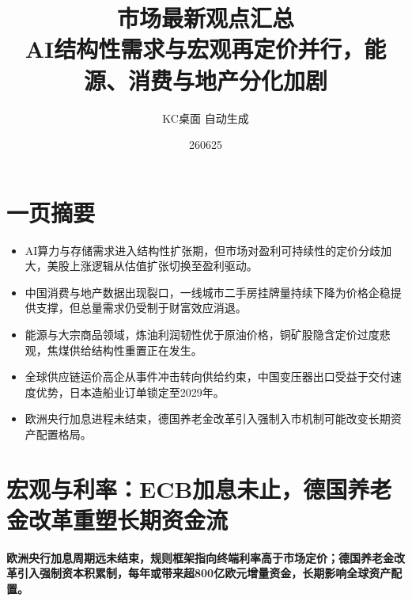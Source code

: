 \documentclass[11pt]{ctexart}
\title{\textbf{市场最新观点汇总}\\[0.4em]{\large AI结构性需求与宏观再定价并行，能源、消费与地产分化加剧}}
\author{KC桌面 自动生成}
\date{260625}
\begin{document}
\maketitle
\tableofcontents
\newpage
\section{一页摘要}
\begin{itemize}
  \item AI算力与存储需求进入结构性扩张期，但市场对盈利可持续性的定价分歧加大，美股上涨逻辑从估值扩张切换至盈利驱动。
  \item 中国消费与地产数据出现裂口，一线城市二手房挂牌量持续下降为价格企稳提供支撑，但总量需求仍受制于财富效应消退。
  \item 能源与大宗商品领域，炼油利润韧性优于原油价格，铜矿股隐含定价过度悲观，焦煤供给结构性重置正在发生。
  \item 全球供应链运价高企从事件冲击转向供给约束，中国变压器出口受益于交付速度优势，日本造船业订单锁定至2029年。
  \item 欧洲央行加息进程未结束，德国养老金改革引入强制入市机制可能改变长期资产配置格局。
\end{itemize}
\section{宏观与利率：ECB加息未止，德国养老金改革重塑长期资金流}
\textbf{欧洲央行加息周期远未结束，规则框架指向终端利率高于市场定价；德国养老金改革引入强制资本积累制，每年或带来超800亿欧元增量资金，长期影响全球资产配置。}
\end{document}
